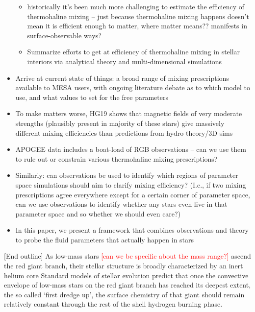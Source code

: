 \begin{itemize}
\begin{itemize}
        \item 
        historically it's been much more challenging to estimate the efficiency of thermohaline mixing -- just because thermohaline mixing happens doesn't mean it is efficient enough to matter, where matter means?? manifests in surface-observable ways?
        
        \item Summarize efforts to get at efficiency of thermohaline mixing in stellar interiors via analytical theory and multi-dimensional simulations
    \end{itemize}
    \item Arrive at current state of things: a broad range of mixing prescriptions available to MESA users, with 
    ongoing literature debate
    as to which model to use, and what values to set for the free parameters
    \item To make matters worse, HG19 shows that magnetic fields of very moderate strengths (plausibly present in majority of these stars) give massively different mixing efficiencies than predictions from hydro theory/3D sims
    \item APOGEE data includes a boat-load of RGB observations -- can we use them to rule out or constrain various thermohaline mixing prescriptions?
    \item Similarly: can observations be used to identify which regions of parameter space simulations should aim to clarify mixing efficiency? (I.e., if two mixing prescriptions agree everywhere except for a certain corner of parameter space, can we use observations to identify whether any stars even live in that parameter space and so whether we should even care?)
    \item In this paper, we present a framework that combines observations and theory to probe the fluid parameters that actually happen in stars
\end{itemize}

[End outline]
As low-mass stars \textcolor{red}{[can we be specific about the mass range?]} ascend the red giant branch, their stellar structure is broadly characterized by an inert helium core
Standard models of stellar evolution predict that once the convective envelope of low-mass stars on the red giant branch has reached its deepest extent, the so called `first dredge up', the surface chemistry of that giant should remain relatively constant through the rest of the shell hydrogen burning phase. 

